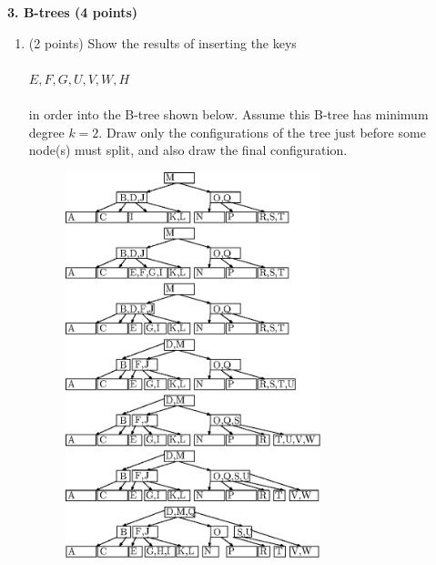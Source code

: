 \documentclass[12pt]{elsart}
\begin{document}
{\bf 3.  B-trees (4 points)}

\begin{enumerate}
   \item (2 points) Show the results of inserting the keys\\\\
$E,F,G,U,V,W,H$\\\\
in order into the B-tree shown below.  Assume this B-tree has minimum degree $k=2$. Draw only the configurations
of the tree just before some node(s) must split, and also draw the final configuration.
\newpage
\begin{figure}[h]
	\centering \includegraphics[width=0.7\textwidth]{BTreeProblem-01}
\end{figure}


\end{enumerate}
\end{document}
